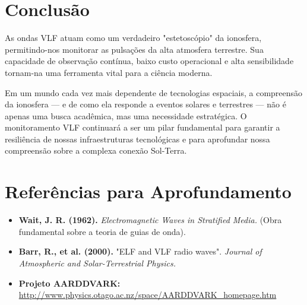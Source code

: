 \documentclass[12pt,a4paper]{article}
\begin{document}
\section{Conclusão}

As ondas VLF atuam como um verdadeiro "estetoscópio" da ionosfera, permitindo-nos monitorar as pulsações da alta atmosfera terrestre. Sua capacidade de observação contínua, baixo custo operacional e alta sensibilidade tornam-na uma ferramenta vital para a ciência moderna.

Em um mundo cada vez mais dependente de tecnologias espaciais, a compreensão da ionosfera --- e de como ela responde a eventos solares e terrestres --- não é apenas uma busca acadêmica, mas uma necessidade estratégica. O monitoramento VLF continuará a ser um pilar fundamental para garantir a resiliência de nossas infraestruturas tecnológicas e para aprofundar nossa compreensão sobre a complexa conexão Sol-Terra.

\section*{Referências para Aprofundamento}
\begin{itemize}
    \item \textbf{Wait, J. R. (1962).} \textit{Electromagnetic Waves in Stratified Media.} (Obra fundamental sobre a teoria de guias de onda).
    \item \textbf{Barr, R., et al. (2000).} "ELF and VLF radio waves". \textit{Journal of Atmospheric and Solar-Terrestrial Physics.}
    \item \textbf{Projeto AARDDVARK:} \url{http://www.physics.otago.ac.nz/space/AARDDVARK_homepage.htm}
\end{itemize}
\end{document}
